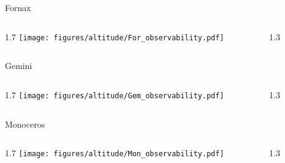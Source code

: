 \documentclass[final]{beamer}
\newlength{\colwidth}
\begin{document}
\begin{frame}[t]{}

  \Large{Fornax}
  \begin{columns}[T]
    \begin{column}{1.7\colwidth}
      \centering
      \texttt{[image: figures/altitude/For\_observability.pdf]}
    \end{column}
    \begin{column}{1.3\colwidth}
      \Large
      
    \end{column}
  \end{columns}

  \Large{Gemini}
  \begin{columns}[T]
    \begin{column}{1.7\colwidth}
      \centering
      \texttt{[image: figures/altitude/Gem\_observability.pdf]}
    \end{column}
    \begin{column}{1.3\colwidth}
      \Large
      
    \end{column}
  \end{columns}

  \Large{Monoceros}
  \begin{columns}[T]
    \begin{column}{1.7\colwidth}
      \centering
      \texttt{[image: figures/altitude/Mon\_observability.pdf]}
    \end{column}
    \begin{column}{1.3\colwidth}
      \Large
      
    \end{column}
  \end{columns}
\end{frame}

\end{document}
